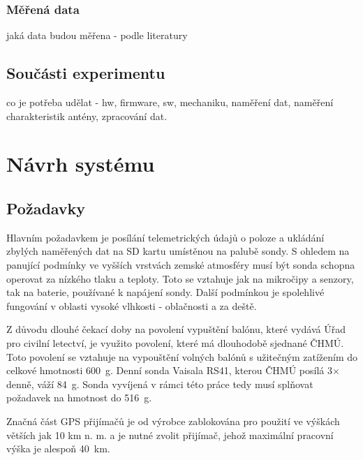 \documentclass[twoside]{ctuthesis}
\theoremstyle{plain}
\theoremstyle{definition}
\theoremstyle{note}
\begin{document}
		\subsection{Měřená data}	
		jaká data budou měřena - podle literatury

	\section{Součásti experimentu}
	co je potřeba udělat - hw, firmware, sw, mechaniku, naměření dat, naměření charakteristik antény, zpracování dat. 
	
















	

\chapter{Návrh systému}

	\section{Požadavky}
	Hlavním požadavkem je posílání telemetrických údajů o poloze a ukládání zbylých naměřených dat na SD kartu umístěnou na palubě sondy. S ohledem na panující podmínky ve vyšších vrstvách zemské atmosféry musí být sonda schopna operovat za nízkého tlaku a teploty. Toto se vztahuje jak na mikročipy a senzory, tak na baterie, používané k napájení sondy. Další podmínkou je spolehlivé fungování v oblasti vysoké vlhkosti - oblačnosti a za deště. 

	Z důvodu dlouhé čekací doby na povolení vypuštění balónu, které vydává Úřad pro civilní letectví, je využito povolení, které má dlouhodobě sjednané ČHMÚ. Toto povolení se vztahuje na vypouštění volných balónů s užitečným zatížením do celkové hmotnosti 600~g. Denní sonda Vaisala RS41, kterou ČHMÚ posílá 3$\times$ denně, váží 84~g. Sonda vyvíjená v rámci této práce tedy musí splňovat požadavek na hmotnost do 516~g.

	Značná část GPS přijímačů je od výrobce zablokována pro použití ve výškách větších jak 10 km n. m. a je nutné zvolit přijímač, jehož maximální pracovní výška je alespoň 40~km.
\end{document}
